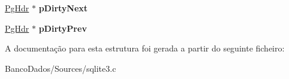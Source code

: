 \begin{DoxyCompactItemize}
\item 
\hypertarget{struct_pg_hdr_a61b56eb694ce445799963f7eb912e367}{\hyperlink{struct_pg_hdr}{Pg\-Hdr} $\ast$ {\bfseries p\-Dirty\-Next}}\label{struct_pg_hdr_a61b56eb694ce445799963f7eb912e367}

\item 
\hypertarget{struct_pg_hdr_a8392b45bb05d88c734020beb912304dc}{\hyperlink{struct_pg_hdr}{Pg\-Hdr} $\ast$ {\bfseries p\-Dirty\-Prev}}\label{struct_pg_hdr_a8392b45bb05d88c734020beb912304dc}

\end{DoxyCompactItemize}


A documentação para esta estrutura foi gerada a partir do seguinte ficheiro\-:\begin{DoxyCompactItemize}
\item 
Banco\-Dados/\-Sources/sqlite3.\-c\end{DoxyCompactItemize}
